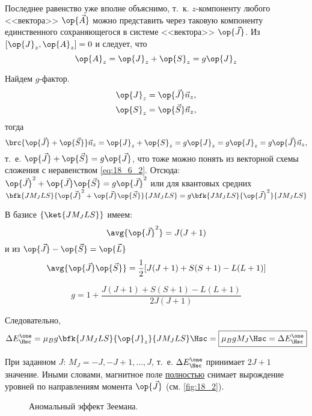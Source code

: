 Последнее равенство уже вполне объяснимо, т.~к. $z$-компоненту любого <<вектора>> $\op{\vec{A}}$ можно представить через таковую компоненту единственного сохраняющегося в системе <<вектора>> $\op{\vec{J}}$. Из $[\op{J}_z, \op{A}_z] = 0$ и следует, что 
$$
\op{A}_z = \op{J}_z + \op{S}_z = g\op{J}_z
$$

Найдем $g$-фактор.
\begin{gather*}
\op{J}_z = \op{\vec{J}} \vec{n}_z, \\
\op{S}_z = \op{\vec{S}} \vec{n}_z,
\end{gather*}
тогда
$$
\brc{\op{\vec{J}} + \op{\vec{S}}}\vec{n}_z = \op{J}_z + \op{S}_z = g \op{J}_z = g \op{J}_z = g \op{\vec{J}} \vec{n}_z,
$$
т.~е. $\op{\vec{J}} + \op{\vec{S}} = g\op{\vec{J}}$, что тоже можно понять из векторной схемы сложения с неравенством \eqref{eq:18_6_2}. Отсюда: 
$\op{\vec{J}}^2 + \op{\vec{J}} \op{\vec{S}} = g \op{\vec{J}}^2$ или для квантовых средних $\bfk{J M_J L S}{\op{\vec{J}}^2 + \op{\vec{J}} \op{\vec{S}}}{J M_J L S} = g \bfk{J M_J L S}{\op{\vec{J}}^2}{J M_J L S}$

В базисе $\{ \ket{J M_J L S}\}$ имеем: \newline
$$\avg{\op{\vec{J}}^2} = J(J+1)$$
и из $\op{\vec{J}} - \op{\vec{S}} = \op{\vec{L}}$
$$
\avg{\op{\vec{J}} \op{\vec{S}}} = \frac{1}{2}[J(J+1) + S(S+1) - L(L + 1)]
$$

\begin{equation}
\label{eq:18_6_3}
\boxed{g = 1 + \frac{J(J+1) + S(S + 1) - L(L + 1)}{2J(J+1)}}
\end{equation}

Следовательно,
\begin{equation}
\label{eq:18_6_4}
\Delta E_{\Hsc}^\one = \mu_B g \bfk{J M_J L S}{\op{J}_z}{J M_J L S} \Hsc = \boxed{\mu_B g M_J \Hsc = \Delta E_{\Hsc}^\one}
\end{equation}

При заданном $J$: $M_J = -J, -J + 1, \dots, J$, т.~е. $\Delta E_{\Hsc}^\one$ принимает $2J+1$ значение. Иными словами, магнитное поле \underline{полностью} снимает вырождение уровней по направлениям момента $\op{\vec{J}}$ (см. \autoref{fig:18_2}).
\begin{figure}[h!]
\centering
{}
\caption{Аномальный эффект Зеемана.} \label{fig:18_2}
\end{figure}

